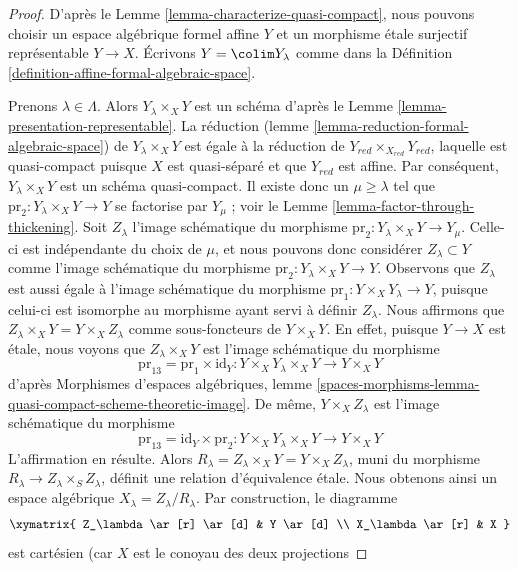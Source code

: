 \begin{proof}
D'après le Lemme \ref{lemma-characterize-quasi-compact}, nous pouvons choisir un
espace algébrique formel affine $Y$ et un morphisme étale surjectif
représentable $Y \to X$. Écrivons $Y = \colim Y_\lambda$ comme dans la
Définition \ref{definition-affine-formal-algebraic-space}.

\medskip\noindent
Prenons $\lambda \in \Lambda$. Alors $Y_\lambda \times_X Y$ est un schéma d'après le
Lemme \ref{lemma-presentation-representable}. La réduction
(lemme \ref{lemma-reduction-formal-algebraic-space})
de $Y_\lambda \times_X Y$ est égale à la réduction de
$Y_{red} \times_{X_{red}} Y_{red}$, laquelle est quasi-compact puisque $X$
est quasi-séparé et que $Y_{red}$ est affine.
Par conséquent, $Y_\lambda \times_X Y$ est un schéma quasi-compact.
Il existe donc un $\mu \geq \lambda$ tel que
$\text{pr}_2 : Y_\lambda \times_X Y \to Y$ se factorise
par $Y_\mu$ ; voir le Lemme \ref{lemma-factor-through-thickening}.
Soit $Z_\lambda$ l'image schématique du morphisme
$\text{pr}_2 : Y_\lambda \times_X Y \to Y_\mu$.
Celle-ci est indépendante du choix de $\mu$, et nous pouvons donc
considérer $Z_\lambda \subset Y$ comme l'image schématique
du morphisme $\text{pr}_2 : Y_\lambda \times_X Y \to Y$.
Observons que $Z_\lambda$ est aussi égale à l'image schématique
du morphisme $\text{pr}_1 : Y \times_X Y_\lambda \to Y$, puisque
celui-ci est isomorphe au morphisme ayant servi à définir $Z_\lambda$.
Nous affirmons que $Z_\lambda \times_X Y = Y \times_X Z_\lambda$ comme sous-foncteurs
de $Y \times_X Y$. En effet, puisque $Y \to X$ est étale, nous voyons que
$Z_\lambda \times_X Y$ est l'image schématique du morphisme
$$
\text{pr}_{13} = \text{pr}_1 \times \text{id}_Y :
Y \times_X Y_\lambda \times_X Y \longrightarrow Y \times_X Y
$$
d'après Morphismes d'espaces algébriques, lemme
\ref{spaces-morphisms-lemma-quasi-compact-scheme-theoretic-image}.
De même, $Y \times_X Z_\lambda$ est l'image schématique
du morphisme
$$
\text{pr}_{13} = \text{id}_Y \times \text{pr}_2 : 
Y \times_X Y_\lambda \times_X Y \longrightarrow Y \times_X Y
$$
L'affirmation en résulte. Alors
$R_\lambda = Z_\lambda \times_X Y = Y \times_X Z_\lambda$,
muni du morphisme $R_\lambda \to Z_\lambda \times_S Z_\lambda$,
définit une relation d'équivalence étale. Nous obtenons ainsi un espace
algébrique $X_\lambda = Z_\lambda/R_\lambda$. Par construction, le diagramme
$$
\xymatrix{
Z_\lambda \ar[r] \ar[d] & Y \ar[d] \\
X_\lambda \ar[r] & X
}
$$
est cartésien (car $X$ est le conoyau des deux projections

\end{proof}
